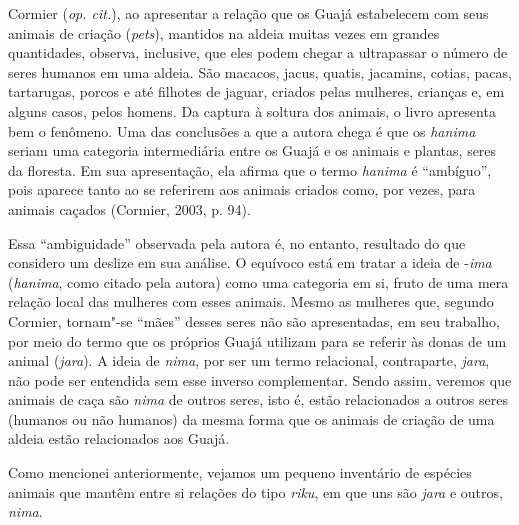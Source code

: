 Cormier (\emph{op. cit.}), ao apresentar a relação que os Guajá estabelecem com
seus animais de criação (\emph{pets}), mantidos na aldeia muitas vezes
em grandes quantidades, observa, inclusive, que eles podem chegar a
ultrapassar o número de seres humanos em uma aldeia. São macacos, jacus,
quatis, jacamins, cotias, pacas, tartarugas, porcos e até filhotes de
jaguar, criados pelas mulheres, crianças e, em alguns casos, pelos
homens. Da captura à soltura dos animais, o livro apresenta bem o
fenômeno. Uma das conclusões a que a autora chega é que os \emph{hanima}
seriam uma categoria intermediária entre os Guajá e os animais e
plantas, seres da floresta. Em sua apresentação, ela afirma que o termo
\emph{hanima} é ``ambíguo'', pois aparece tanto ao se referirem aos
animais criados como, por vezes, para animais caçados (Cormier, 2003, p.
94).

Essa ``ambiguidade'' observada pela autora é, no entanto, resultado do que
considero um deslize em sua análise. O equívoco está em tratar a ideia
de -\emph{ima} (\emph{hanima}, como citado pela autora) como uma
categoria em si, fruto de uma mera relação local das mulheres com esses
animais. Mesmo as mulheres que, segundo Cormier, tornam"-se ``mães'' desses
seres não são apresentadas, em seu trabalho, por meio do termo que os
próprios Guajá utilizam para se referir às donas de um animal
(\emph{jara}). A ideia de \emph{nima}, por ser um termo relacional,
contraparte, \emph{jara}, não pode ser entendida sem esse inverso
complementar. Sendo assim, veremos que animais de caça são \emph{nima}
de outros seres, isto é, estão relacionados a outros seres (humanos ou
não humanos) da mesma forma que os animais de criação de uma aldeia
estão relacionados aos Guajá.

Como mencionei anteriormente, vejamos um pequeno inventário de espécies
animais que mantêm entre si relações do tipo \emph{riku}, em que uns são
\emph{jara} e outros, \emph{nima}.

